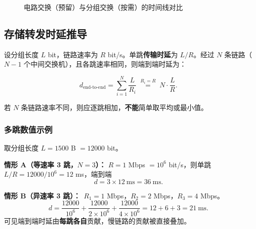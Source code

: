\begin{figure}[H]
\centering
{}
\caption{电路交换（预留）与分组交换（按需）的时间线对比}
\label{fig:circuit_vs_packet}
\end{figure}

\subsection{存储转发时延推导}
设分组长度 $L$ bit，链路速率为 $R$ bit/s。单跳\textbf{传输时延}为 $L/R$。经过 $N$ 条链路（$N-1$ 个中间交换机），且各跳速率相同，则端到端时延为：

\begin{equation}
    d_{\text{end-to-end}} = \sum_{i=1}^{N} \frac{L}{R_i} \;\overset{R_i=R}{=}\; N \cdot \frac{L}{R}.
\end{equation}

若 $N$ 条链路速率不同，则应逐跳相加，\textbf{不能}简单取平均或最小值。

\subsubsection{多跳数值示例}
取分组长度 $L = 1500$ B $= 12000$ bit。

\textbf{情形 A（等速率 3 跳，$N=3$）：}
$R = 1$ Mbps $= 10^6$ bit/s，则单跳 $L/R = 12000/10^6 = 12$ ms，端到端
\[
d = 3 \times 12\ \text{ms} = 36\ \text{ms}.
\]

\textbf{情形 B（异速率 3 跳）：}\ $R_1 = 1$ Mbps，$R_2 = 2$ Mbps，$R_3 = 4$ Mbps。
\[
d = \frac{12000}{10^6} + \frac{12000}{2\times10^6} + \frac{12000}{4\times10^6}
  = 12 + 6 + 3 = 21\ \text{ms}.
\]
可见端到端时延由\textbf{每跳各自}贡献，慢链路的贡献被直接叠加。

